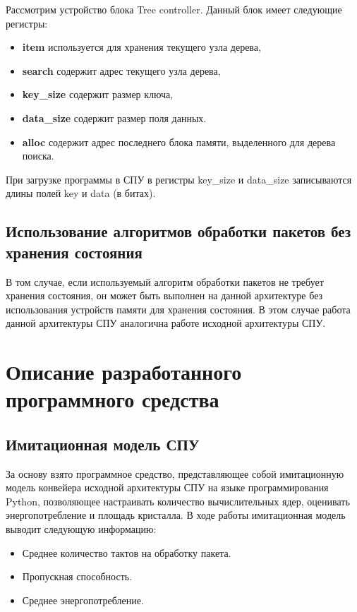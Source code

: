 \documentclass[conference]{IEEEtran}
\begin{document}
Рассмотрим устройство блока Tree controller. Данный блок имеет следующие
регистры:
\begin{itemize}
	\item {\bfseries item} используется для хранения текущего узла дерева,
	\item {\bfseries search} содержит адрес текущего узла дерева,
	\item {\bfseries key\_size} содержит размер ключа,
	\item {\bfseries data\_size} содержит размер поля данных.
	\item {\bfseries alloc} содержит адрес последнего блока памяти,
		выделенного для дерева поиска.
\end{itemize}
При загрузке программы в СПУ в регистры key\_size и data\_size записываются
длины полей key и data (в битах).

\subsection{Использование алгоритмов обработки пакетов без хранения состояния}
В том случае, если используемый алгоритм обработки пакетов не требует
хранения состояния, он может быть выполнен на данной архитектуре
без использования устройств памяти для хранения состояния. В этом
случае работа данной архитектуры СПУ аналогична работе
исходной архитектуры СПУ.


\section{Описание разработанного программного средства}

\subsection{Имитационная модель СПУ}
За основу взято программное средство, представляющее собой имитационную
модель конвейера исходной архитектуры СПУ на языке программирования Python,
позволяющее настраивать количество вычислительных ядер, оценивать
энергопотребление и площадь кристалла.
В ходе работы имитационная модель выводит следующую информацию:
\begin{itemize}
	\item Среднее количество тактов на обработку пакета.
	\item Пропускная способность.
	\item Среднее энергопотребление.
\end{itemize}
\end{document}
